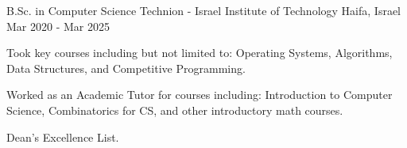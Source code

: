

\begin{cventries}

  \cventry
    {B.Sc. in Computer Science} %
    {Technion - Israel Institute of Technology} %
    {Haifa, Israel} %
    {Mar 2020 - Mar 2025} %
    {
      \begin{cvitems} %
        \item {Took key courses including but not limited to: Operating Systems, Algorithms, Data Structures, and Competitive Programming.}
        \item {Worked as an Academic Tutor for courses including: Introduction to Computer Science, Combinatorics for CS, and other introductory math courses.}
        \item {Dean's Excellence List.}
      \end{cvitems}
    }

\end{cventries}